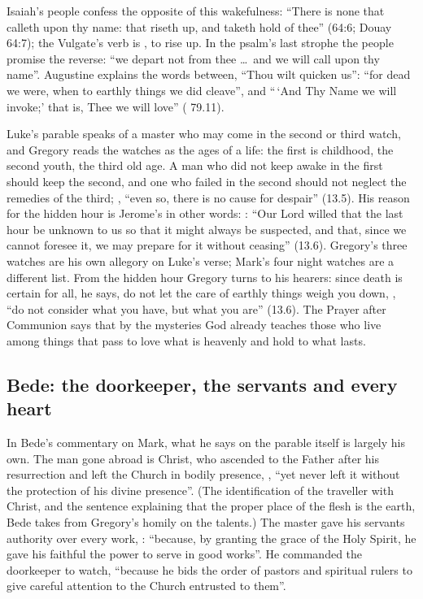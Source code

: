 Isaiah's people confess the opposite of this wakefulness: ``There is none
that calleth upon thy name: that riseth up, and taketh hold of thee'' (64:6;
Douay 64:7); the Vulgate's verb is , to rise up. In the
psalm's last strophe the people promise the reverse: ``we depart not from
thee \ldots\ and we will call upon thy name''. Augustine explains the words
between, ``Thou wilt quicken us'': ``for dead we were, when to earthly things
we did cleave'', and ``\,`And Thy Name we will invoke;' that is, Thee we will
love'' ( 79.11).

Luke's parable speaks of a master who may come in the second or third watch,
and Gregory reads the watches as the ages of a life: the first is childhood,
the second youth, the third old age. A man who did not keep awake in the
first should keep the second, and one who failed in the second should not
neglect the remedies of the third; , ``even
so, there is no cause for despair'' (13.5). His reason for the hidden hour
is Jerome's in other words: : ``Our Lord
willed that the last hour be unknown to us so that it might always be
suspected, and that, since we cannot foresee it, we may prepare for it
without ceasing'' (13.6). Gregory's three watches are his own allegory on
Luke's verse; Mark's four night watches are a different list. From the hidden
hour Gregory turns to his hearers: since death is certain for all, he says,
do not let the care of earthly things weigh you down, , ``do not consider what you have, but what you
are'' (13.6). The Prayer after Communion says that by the mysteries God
already teaches those who live among things that pass to love what is
heavenly and hold to what lasts.

\subsection{Bede: the doorkeeper, the servants and every heart}

In Bede's commentary on Mark, what he says on the parable itself is largely
his own. The man gone abroad is Christ, who ascended to the Father after his resurrection and left
the Church in bodily presence, , ``yet never left it without the protection of his
divine presence''. (The identification of the traveller with Christ, and the
sentence explaining that the proper place of the flesh is the earth, Bede
takes from Gregory's homily on the talents.) The master gave his servants
authority over every work, : ``because, by
granting the grace of the Holy Spirit, he gave his faithful the power to
serve in good works''. He commanded the doorkeeper to watch, ``because he bids
the order of pastors and spiritual rulers to give careful attention to the
Church entrusted to them''.

